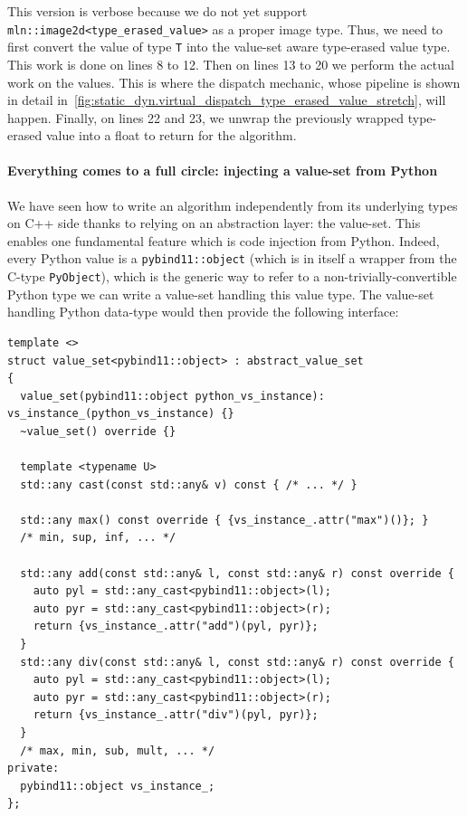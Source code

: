 This version is verbose because we do not yet support \texttt{mln::image2d<type\_erased\_value>} as a proper image type.
Thus, we need to first convert the value of type \texttt{T} into the value-set aware type-erased value type. This work is
done on lines 8 to 12. Then on lines 13 to 20 we perform the actual work on the values. This is where the dispatch
mechanic, whose pipeline is shown in detail in~\cref{fig:static_dyn.virtual_dispatch_type_erased_value_stretch}, will
happen. Finally, on lines 22 and 23, we unwrap the previously wrapped type-erased value into a float to return for the
algorithm.


\paragraph{Everything comes to a full circle: injecting a value-set from Python}

We have seen how to write an algorithm independently from its underlying types on C++ side thanks to relying on an
abstraction layer: the value-set. This enables one fundamental feature which is code injection from Python. Indeed,
every Python value is a \texttt{pybind11::object} (which is in itself a wrapper from the C-type \texttt{PyObject}),
which is the generic way to refer to a non-trivially-convertible Python type we can write a value-set handling this
value type. The value-set handling Python data-type would then provide the following interface:

\begin{verbatim}
template <>
struct value_set<pybind11::object> : abstract_value_set
{
  value_set(pybind11::object python_vs_instance): vs_instance_(python_vs_instance) {}
  ~value_set() override {}

  template <typename U>
  std::any cast(const std::any& v) const { /* ... */ }

  std::any max() const override { {vs_instance_.attr("max")()}; }
  /* min, sup, inf, ... */

  std::any add(const std::any& l, const std::any& r) const override {
    auto pyl = std::any_cast<pybind11::object>(l);
    auto pyr = std::any_cast<pybind11::object>(r);
    return {vs_instance_.attr("add")(pyl, pyr)};
  }
  std::any div(const std::any& l, const std::any& r) const override {
    auto pyl = std::any_cast<pybind11::object>(l);
    auto pyr = std::any_cast<pybind11::object>(r);
    return {vs_instance_.attr("div")(pyl, pyr)};
  }
  /* max, min, sub, mult, ... */
private:
  pybind11::object vs_instance_;
};
\end{verbatim}

